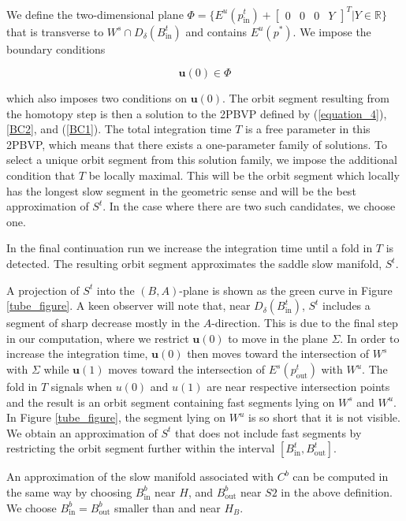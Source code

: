 \documentclass{ws-ijbc}
\begin{document}
We define the two-dimensional plane $\Phi = \{E^u(p^t_{\mathrm{in}}) + \begin{bmatrix} 0 & 0 & 0 & Y \end{bmatrix}^{T}| Y \in \mathbb{R} \}$ that is transverse to $W^s \cap D_{\delta}(B^t_{\mathrm{in}})$ and contains $E^u(p^*)$.  We impose the boundary conditions
    
\begin{equation}
\mathbf{u}(0) \in \Phi
\label{BC1}
\end{equation}
    
\noindent
which also imposes two conditions on $\mathbf{u}(0)$.  The orbit segment resulting from the homotopy step is then a solution to the 2PBVP defined by (\ref{equation_4}), \ref{BC2}, and (\ref{BC1}).  The total integration time $T$ is a free parameter in this 2PBVP, which means that there exists a one-parameter family of solutions.  To select a unique orbit segment from this solution family, we impose the additional condition that $T$ be locally maximal.  This will be the orbit segment which locally has the longest slow segment in the geometric sense and will be the best approximation of $S^t$.  In the case where there are two such candidates, we choose one.
    
In the final continuation run we increase the integration time until a fold in $T$ is detected.  The resulting orbit segment approximates the saddle slow manifold, $S^t$.
   
A projection of $S^t$ into the $(B,A)$-plane is shown as the green curve in Figure \ref{tube_figure}.  A keen observer will note that, near $D_\delta(B^t_{\mathrm{in}})$, $S^t$ includes a segment of sharp decrease mostly in the $A$-direction.  This is due to the final step in our computation, where we restrict $\mathbf{u}(0)$ to move in the plane $\Sigma$.  In order to increase the integration time, $\mathbf{u}(0)$ then moves toward the intersection of $W^s$ with $\Sigma$ while $\mathbf{u}(1)$ moves toward the intersection of $E^s(p^t_{\mathrm{out}})$ with $W^u$.  The fold in $T$ signals when $u(0)$ and $u(1)$ are near respective intersection points and the result is an orbit segment containing fast segments lying on $W^s$ and $W^u$.  In Figure \ref{tube_figure}, the segment lying on $W^u$ is so short that it is not visible.  We obtain an approximation of $S^t$ that does not include fast segments by restricting the orbit segment further within the interval $[B^t_{\mathrm{in}},B^t_{\mathrm{out}}]$.
   
An approximation of the slow manifold associated with $C^b$ can be computed in the same way by choosing $B^b_{\mathrm{in}}$ near $H$, and $B^b_{\mathrm{out}}$ near $S2$ in the above definition.  We choose $B^b_{\mathrm{in}}=B^b_{\mathrm{out}}$ smaller than and near $H_B$.
\end{document}
